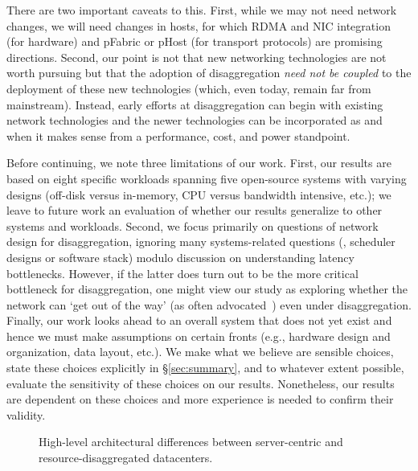 There are two important caveats to this.  First, while we may not need network changes, we will need changes in hosts, for which RDMA and NIC integration (for hardware) and pFabric or pHost (for transport protocols) are promising directions. Second, our point is not that new networking technologies are not worth pursuing but that the adoption of disaggregation \emph{need not be coupled} to the deployment of these new technologies (which, even today, remain far from mainstream). Instead, early efforts at disaggregation can begin with existing network technologies and the newer technologies can be incorporated as and when it makes sense from a performance, cost, and power standpoint.

Before continuing, we note three limitations of our work. First, our results are based on eight specific workloads spanning five open-source systems with varying designs (off-disk versus in-memory, CPU versus bandwidth intensive, etc.); we leave to future work an evaluation of whether our results generalize to other systems and workloads. Second, we focus primarily on questions of network design for disaggregation, ignoring many systems-related questions (\eg, scheduler designs or software stack) modulo discussion on understanding latency bottlenecks. However, if the latter does turn out to be the more critical bottleneck for disaggregation, one might view our study as exploring whether the network can `get out of the way' (as often advocated~\cite{greenberg-sigcomm15}) even under disaggregation. Finally, our work looks ahead to an overall system that does not yet exist and hence we must make assumptions on certain fronts (e.g., hardware design and organization, data layout, etc.). We make what we believe are sensible choices, state these choices explicitly in \S\ref{sec:summary}, and to whatever extent possible, evaluate the sensitivity of these choices on our results. Nonetheless, our results are dependent on these choices and more experience is needed to confirm their validity.

\begin{figure}[!t]
\centering 
{}
\hfill
{}
\caption{High-level architectural differences between server-centric and resource-disaggregated datacenters.}
\label{fig:dc}
\end{figure}


